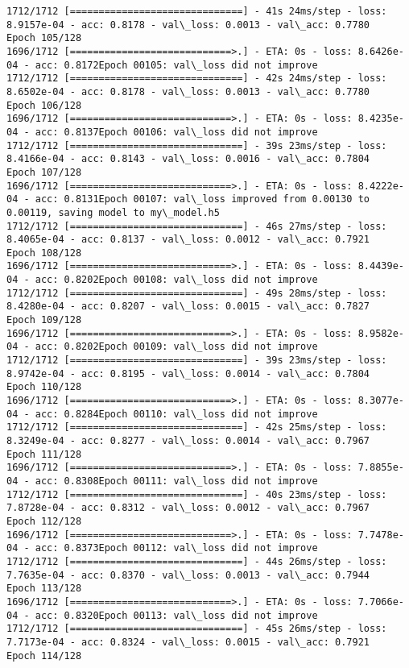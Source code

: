\documentclass[11pt]{article}
\begin{document}
\begin{Verbatim}[commandchars=\\\{\}]
1712/1712 [==============================] - 41s 24ms/step - loss: 8.9157e-04 - acc: 0.8178 - val\_loss: 0.0013 - val\_acc: 0.7780
Epoch 105/128
1696/1712 [============================>.] - ETA: 0s - loss: 8.6426e-04 - acc: 0.8172Epoch 00105: val\_loss did not improve
1712/1712 [==============================] - 42s 24ms/step - loss: 8.6502e-04 - acc: 0.8178 - val\_loss: 0.0013 - val\_acc: 0.7780
Epoch 106/128
1696/1712 [============================>.] - ETA: 0s - loss: 8.4235e-04 - acc: 0.8137Epoch 00106: val\_loss did not improve
1712/1712 [==============================] - 39s 23ms/step - loss: 8.4166e-04 - acc: 0.8143 - val\_loss: 0.0016 - val\_acc: 0.7804
Epoch 107/128
1696/1712 [============================>.] - ETA: 0s - loss: 8.4222e-04 - acc: 0.8131Epoch 00107: val\_loss improved from 0.00130 to 0.00119, saving model to my\_model.h5
1712/1712 [==============================] - 46s 27ms/step - loss: 8.4065e-04 - acc: 0.8137 - val\_loss: 0.0012 - val\_acc: 0.7921
Epoch 108/128
1696/1712 [============================>.] - ETA: 0s - loss: 8.4439e-04 - acc: 0.8202Epoch 00108: val\_loss did not improve
1712/1712 [==============================] - 49s 28ms/step - loss: 8.4280e-04 - acc: 0.8207 - val\_loss: 0.0015 - val\_acc: 0.7827
Epoch 109/128
1696/1712 [============================>.] - ETA: 0s - loss: 8.9582e-04 - acc: 0.8202Epoch 00109: val\_loss did not improve
1712/1712 [==============================] - 39s 23ms/step - loss: 8.9742e-04 - acc: 0.8195 - val\_loss: 0.0014 - val\_acc: 0.7804
Epoch 110/128
1696/1712 [============================>.] - ETA: 0s - loss: 8.3077e-04 - acc: 0.8284Epoch 00110: val\_loss did not improve
1712/1712 [==============================] - 42s 25ms/step - loss: 8.3249e-04 - acc: 0.8277 - val\_loss: 0.0014 - val\_acc: 0.7967
Epoch 111/128
1696/1712 [============================>.] - ETA: 0s - loss: 7.8855e-04 - acc: 0.8308Epoch 00111: val\_loss did not improve
1712/1712 [==============================] - 40s 23ms/step - loss: 7.8728e-04 - acc: 0.8312 - val\_loss: 0.0012 - val\_acc: 0.7967
Epoch 112/128
1696/1712 [============================>.] - ETA: 0s - loss: 7.7478e-04 - acc: 0.8373Epoch 00112: val\_loss did not improve
1712/1712 [==============================] - 44s 26ms/step - loss: 7.7635e-04 - acc: 0.8370 - val\_loss: 0.0013 - val\_acc: 0.7944
Epoch 113/128
1696/1712 [============================>.] - ETA: 0s - loss: 7.7066e-04 - acc: 0.8320Epoch 00113: val\_loss did not improve
1712/1712 [==============================] - 45s 26ms/step - loss: 7.7173e-04 - acc: 0.8324 - val\_loss: 0.0015 - val\_acc: 0.7921
Epoch 114/128

\end{Verbatim}
\end{document}
